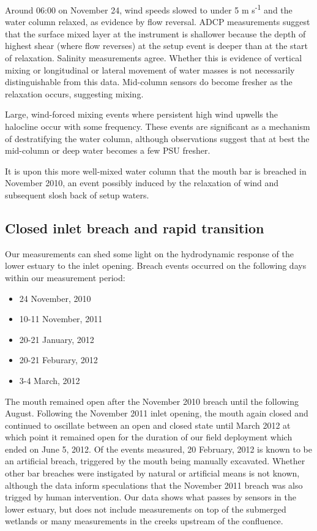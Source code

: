 Around 06:00 on November 24, wind speeds slowed to under 5 m s\textsuperscript{-1} and the water column relaxed, as evidence by flow reversal. ADCP measurements suggest that the surface mixed layer at the instrument is shallower because the depth of highest shear (where flow reverses) at the setup event is deeper than at the start of relaxation. Salinity measurements agree. Whether this is evidence of vertical mixing or longitudinal or lateral movement of water masses is not necessarily distinguishable from this data. Mid-column sensors do become fresher as the relaxation occurs, suggesting mixing. 

Large, wind-forced mixing events where persistent high wind upwells the halocline occur with some frequency. These events are significant as a mechanism of destratifying the water column, although observations suggest that at best the mid-column or deep water becomes a few PSU fresher. 

It is upon this more well-mixed water column that the mouth bar is breached in November 2010, an event possibly induced by the relaxation of wind and subsequent slosh back of setup waters. 

\subsection{Closed inlet breach and rapid transition} \label{breach_dynamics}
Our measurements can shed some light on the hydrodynamic response of the lower estuary to the inlet opening. Breach events occurred on the following days within our measurement period:
\begin{itemize}
	\item 24 November, 2010
	\item 10-11 November, 2011
	\item 20-21 January, 2012
	\item 20-21 Feburary, 2012
	\item 3-4 March, 2012
\end{itemize}
The mouth remained open after the November 2010 breach until the following August. Following the November 2011 inlet opening, the mouth again closed and continued to oscillate between an open and closed state until March 2012 at which point it remained open for the duration of our field deployment which ended on June 5, 2012. Of the events measured, 20 February, 2012 is known to be an artificial breach, triggered by the mouth being manually excavated. Whether other bar breaches were instigated by natural or artificial means is not known, although the data inform speculations that the November 2011 breach was also trigged by human intervention. Our data shows what passes by sensors in the lower estuary, but does not include measurements on top of the submerged wetlands or many measurements in the creeks upstream of the confluence.


